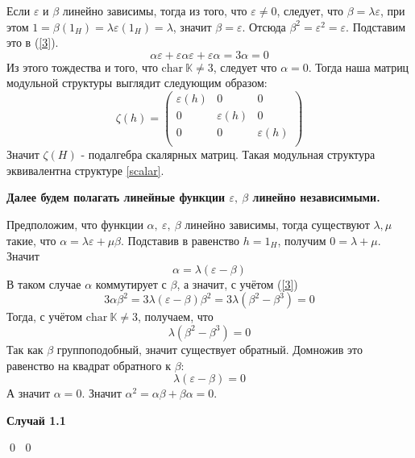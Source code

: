 \documentclass[12pt, reqno, a4paper, oneside, notitlepage]{amsart}
\makeatletter
\theoremstyle{mytheoremstyle}
\theoremstyle{myremarkstyle}
\numberwithin{equation}{section}
\renewenvironment{proof}[1][\proofname]{\par\indent {\bfseries #1\@addpunct{.} }}{\qed}
\makeatother
\begin{document}
\begin{proof}
\begin{proof}
    Если $\varepsilon$ и $\beta$ линейно зависимы, тогда из того, что $\varepsilon \neq 0$, следует, что $\beta = \lambda\varepsilon$, при этом $1 = \beta(1_H)=\lambda\varepsilon(1_H)=\lambda$, значит $\beta = \varepsilon$.
    Отсюда $\beta^2 = \varepsilon^2 = \varepsilon$. Подставим это в (\ref{3}).
    \[
        \alpha\varepsilon + \varepsilon\alpha \varepsilon + \varepsilon \alpha = 3\alpha = 0
    \]
    Из этого тождества и того, что $\mathrm{char} \ \mathbb{K} \neq 3$, следует что $\alpha = 0$. Тогда наша матриц модульной структуры выглядит следующим образом:\[
    \zeta(h) = \begin{pmatrix}
        \varepsilon(h) & 0 & 0\\
        0 & \varepsilon(h) & 0\\
        0 & 0 & \varepsilon(h)\\
    \end{pmatrix}
    \]
    Значит $\zeta(H)$ - подалгебра скалярных матриц. Такая модульная структура эквивалентна структуре \ref{scalar}.
    
    \textbf{Далее будем полагать линейные функции $\varepsilon,\ \beta$ линейно независимыми.}

    Предположим, что функции $\alpha,\ \varepsilon,\ \beta$ линейно зависимы, тогда существуют $\lambda, \mu$ такие, что $\alpha = \lambda \varepsilon + \mu \beta$. 
    Подставив в равенство $h = 1_H$, получим $0 = \lambda + \mu$.
    Значит \[\alpha = \lambda(\varepsilon - \beta)\]
    В таком случае $\alpha$ коммутирует с $\beta$, а значит, с учётом (\ref{3})
    \[
        3\alpha\beta^2 = 3\lambda(\varepsilon-\beta)\beta^2 = 3\lambda(\beta^2-\beta^3)=0
    \]
    Тогда, с учётом $\mathrm{char} \ \mathbb{K} \neq 3$, получаем, что
    \[
        \lambda(\beta^2-\beta^3) = 0
    \]
    Так как $\beta$ группоподобный, значит существует обратный. Домножив это равенство на квадрат обратного к $\beta$:
    \[
        \lambda(\varepsilon-\beta) = 0
    \]
    А значит $\alpha = 0$. Значит $\alpha^2 = \alpha\beta+\beta\alpha = 0$. 
    
    \textbf{Случай 1.1}
    

\end{proof}
\end{proof}
\end{document}

